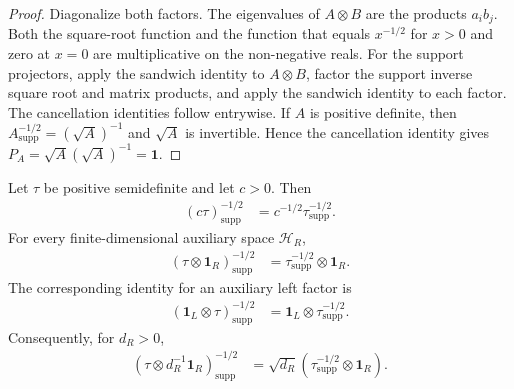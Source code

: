\begin{proof}\leanok
    Diagonalize both factors. The eigenvalues of $A\otimes B$ are the products
    $a_i b_j$. Both the square-root function and the function that equals
    $x^{-1/2}$ for $x>0$ and zero at $x=0$ are multiplicative on the
    non-negative reals. For the support projectors, apply the sandwich identity
    to $A\otimes B$, factor the support inverse square root and matrix products,
    and apply the sandwich identity to each factor. The cancellation identities
    follow entrywise. If $A$ is positive definite, then
    $A^{-1/2}_{\mathrm{supp}}=(\sqrt A)^{-1}$ and $\sqrt A$ is invertible.
    Hence the cancellation identity gives $P_A=\sqrt A(\sqrt A)^{-1}=\mathbf 1$.
\end{proof}

\begin{lemma}
    \label{lem:support_inverse_square_root_maximally_mixed}
    \leanok
    Let $\tau$ be positive semidefinite and let $c>0$. Then
    \begin{align}
        (c\tau)^{-1/2}_{\mathrm{supp}}
        &=c^{-1/2}\tau^{-1/2}_{\mathrm{supp}}.
        \label{eq:entropy_support_scaling}
    \end{align}
    For every finite-dimensional auxiliary space $\mathcal H_R$,
    \begin{align}
        (\tau\otimes\mathbf 1_R)^{-1/2}_{\mathrm{supp}}
        &=\tau^{-1/2}_{\mathrm{supp}}\otimes\mathbf 1_R.
        \label{eq:entropy_support_tensor}
    \end{align}
    The corresponding identity for an auxiliary left factor is
    \begin{align}
        (\mathbf 1_L\otimes\tau)^{-1/2}_{\mathrm{supp}}
        &=\mathbf 1_L\otimes\tau^{-1/2}_{\mathrm{supp}}.
        \label{eq:entropy_support_tensor_left}
    \end{align}
    Consequently, for $d_R>0$,
    \begin{align}
        (\tau\otimes d_R^{-1}\mathbf 1_R)^{-1/2}_{\mathrm{supp}}
        &=\sqrt{d_R}
          (\tau^{-1/2}_{\mathrm{supp}}\otimes\mathbf 1_R).
        \label{eq:entropy_support_mixed}
    \end{align}
\end{lemma}

